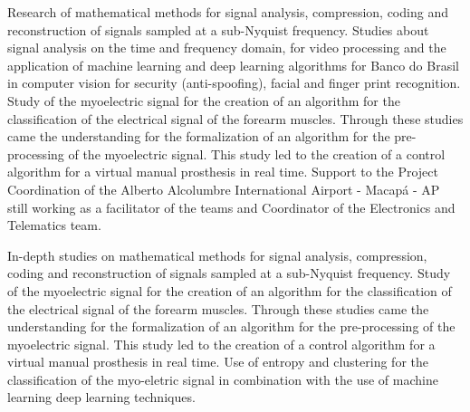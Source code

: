 \documentclass[
	a4paper,
]{fortysecondscv}
\begin{document}
\makefrontsidebar


\begin{cvtable}[3]
	    {Research of mathematical methods for signal analysis, compression, coding and reconstruction of signals sampled at a sub-Nyquist frequency.}
	    {Studies about signal analysis on the time and frequency domain, for video processing and the application of machine learning and deep learning algorithms for Banco do Brasil in computer vision for security (anti-spoofing), facial and finger print recognition.}
        {Study of the myoelectric signal for the creation of an algorithm for the classification of the electrical signal of the forearm muscles. Through these studies came the understanding for the formalization of an algorithm for the pre-processing of the myoelectric signal. This study led to the creation of a control algorithm for a virtual manual prosthesis in real time.}
        {Support to the Project Coordination of the Alberto Alcolumbre International Airport - Macapá - AP still working as a facilitator of the teams and Coordinator of the Electronics and Telematics team.}
\end{cvtable}


\begin{cvtable}[1.5]
		{In-depth studies on mathematical methods for signal analysis, compression, coding and reconstruction of signals sampled at a sub-Nyquist frequency.}
		{Study of the myoelectric signal for the creation of an algorithm for the classification of the electrical signal of the forearm muscles. Through these studies came the understanding for the formalization of an algorithm for the pre-processing of the myoelectric signal. This study led to the creation of a control algorithm for a virtual manual prosthesis in real time.}
		{Use of entropy and clustering for the classification of the myo-eletric signal in combination with the use of machine learning deep learning techniques.}
\end{cvtable}
\end{document}
